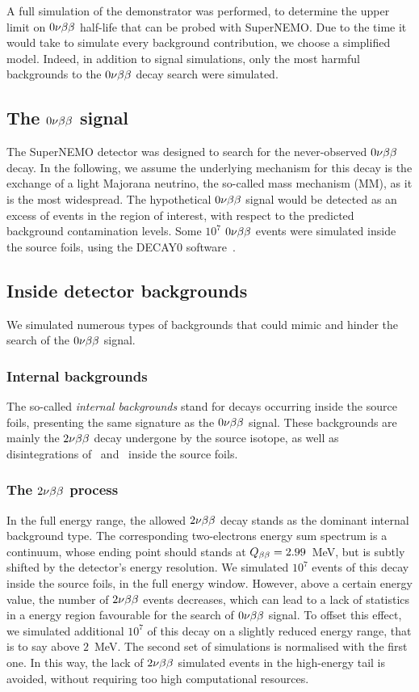 A full simulation of the demonstrator was performed, to determine the upper limit on $0\nu\beta\beta$ half-life that can be probed with SuperNEMO.
Due to the time it would take to simulate every background contribution, we choose a simplified model.
Indeed, in addition to signal simulations, only the most harmful backgrounds to the $0\nu\beta\beta$ decay search were simulated.

\subsection{The $0\nu\beta\beta$ signal}

The SuperNEMO detector was designed to search for the never-observed $0\nu\beta\beta$ decay.
In the following, we assume the underlying mechanism for this decay is the exchange of a light Majorana neutrino, the so-called mass mechanism (MM), as it is the most widespread.
The hypothetical $0\nu\beta\beta$ signal would be detected as an excess of events in the region of interest, with respect to the predicted background contamination levels.
Some $10^{7}$ $0\nu\beta\beta$ events were simulated inside the source foils, using the DECAY$0$ software~\cite{art:decay0}.

\subsection{Inside detector backgrounds}

We simulated numerous types of backgrounds that could mimic and hinder the search of the $0\nu\beta\beta$ signal.

\subsubsection{Internal backgrounds}

The so-called \emph{internal backgrounds} stand for decays occurring inside the source foils, presenting the same signature as the $0\nu\beta\beta$ signal.
These backgrounds are mainly the $2\nu\beta\beta$ decay undergone by the source isotope, as well as disintegrations of \Tl\ and \Bi\ inside the source foils.

\subsubsection*{The $2\nu\beta\beta$ process}

In the full energy range, the allowed $2\nu\beta\beta$ decay stands as the dominant internal background type.
The corresponding two-electrons energy sum spectrum is a continuum, whose ending point should stands at $Q_{\beta\beta} = 2.99$~MeV, but is subtly shifted by the detector's energy resolution.
We simulated $10^{7}$ events of this decay inside the source foils, in the full energy window.
However, above a certain energy value, the number of $2\nu\beta\beta$ events decreases, which can lead to a lack of statistics in a energy region favourable for the search of $0\nu\beta\beta$ signal.
To offset this effect, we simulated additional $10^{7}$ of this decay on a slightly reduced energy range, that is to say above $2$~MeV.
The second set of simulations is normalised with the first one.
In this way, the lack of $2\nu\beta\beta$ simulated events in the high-energy tail is avoided, without requiring too high computational resources.

